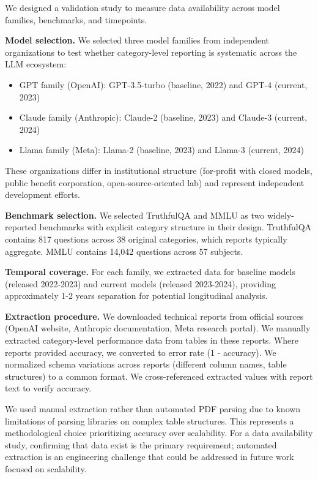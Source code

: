 
We designed a validation study to measure data availability across model families, benchmarks, and timepoints.

\textbf{Model selection.} We selected three model families from independent organizations to test whether category-level reporting is systematic across the LLM ecosystem:
\begin{itemize}
\item GPT family (OpenAI): GPT-3.5-turbo (baseline, 2022) and GPT-4 (current, 2023)
\item Claude family (Anthropic): Claude-2 (baseline, 2023) and Claude-3 (current, 2024)
\item Llama family (Meta): Llama-2 (baseline, 2023) and Llama-3 (current, 2024)
\end{itemize}

These organizations differ in institutional structure (for-profit with closed models, public benefit corporation, open-source-oriented lab) and represent independent development efforts.

\textbf{Benchmark selection.} We selected TruthfulQA and MMLU as two widely-reported benchmarks with explicit category structure in their design. TruthfulQA contains 817 questions across 38 original categories, which reports typically aggregate. MMLU contains 14,042 questions across 57 subjects.

\textbf{Temporal coverage.} For each family, we extracted data for baseline models (released 2022-2023) and current models (released 2023-2024), providing approximately 1-2 years separation for potential longitudinal analysis.

\textbf{Extraction procedure.} We downloaded technical reports from official sources (OpenAI website, Anthropic documentation, Meta research portal). We manually extracted category-level performance data from tables in these reports. Where reports provided accuracy, we converted to error rate (1 - accuracy). We normalized schema variations across reports (different column names, table structures) to a common format. We cross-referenced extracted values with report text to verify accuracy.

We used manual extraction rather than automated PDF parsing due to known limitations of parsing libraries on complex table structures. This represents a methodological choice prioritizing accuracy over scalability. For a data availability study, confirming that data exist is the primary requirement; automated extraction is an engineering challenge that could be addressed in future work focused on scalability.

